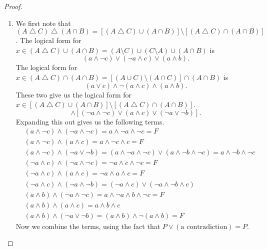 \documentclass[12pt]{amsart}
\theoremstyle{definition}
\theoremstyle{remark}
\begin{document}
\begin{proof}
\begin{enumerate}
	\item We first note that $(A \bigtriangleup C) \bigtriangleup (A \cap B) = [(A \bigtriangleup C) \cup (A \cap B)] \setminus [(A \bigtriangleup C) \cap (A \cap B)]$.
	The logical form for $x \in (A \bigtriangleup C) \cup (A \cap B) = (A \setminus C) \cup (C \setminus A) \cup (A \cap B)$ is
	\begin{equation*}
		(a \wedge \neg c) \vee (\neg a \wedge c) \vee (a \wedge b).
	\end{equation*}
	The logical form for $x \in (A \bigtriangleup C) \cap (A \cap B) = [(A \cup C) \setminus (A \cap C)] \cap (A \cap B)$ is
	\begin{equation*}
		(a \vee c) \wedge \neg (a \wedge c) \wedge (a \wedge b).
	\end{equation*}
	These two give us the logical form for $x \in [(A \bigtriangleup C) \cup (A \cap B)] \setminus [(A \bigtriangleup C) \cap (A \cap B)]$.
	\begin{equation*}
		[(a \wedge \neg c) \vee (\neg a \wedge c) \vee (a \wedge b)]
		\wedge [(\neg a \wedge \neg c) \vee (a \wedge c) \vee (\neg a \vee \neg b)].
	\end{equation*}
	Expanding this out gives us the following terms.
	\begin{align*}
		& (a \wedge \neg c) \wedge (\neg a \wedge \neg c) = a \wedge \neg a \wedge \neg c = F \\
		& (a \wedge \neg c) \wedge (a \wedge c) = a \wedge \neg c \wedge c = F \\
		& (a \wedge \neg c) \wedge (\neg a \vee \neg b) 
			= (a \wedge \neg a \wedge \neg c) \vee (a \wedge \neg b \wedge \neg c)
			= a \wedge \neg b \wedge \neg c \\
		& (\neg a \wedge c) \wedge (\neg a \wedge \neg c) = \neg a \wedge c \wedge \neg c = F \\
		& (\neg a \wedge c) \wedge (a \wedge c) = \neg a \wedge a \wedge c = F \\
		& (\neg a \wedge c) \wedge (\neg a \wedge \neg b) 
			= (\neg a \wedge c) \vee (\neg a \wedge \neg b \wedge c) \\
		& (a \wedge b) \wedge (\neg a \wedge \neg c) 
		= a \wedge \neg a \wedge b \wedge \neg c = F \\
		& (a \wedge b) \wedge (a \wedge c) = a \wedge b \wedge c \\
		& (a \wedge b) \wedge (\neg a \vee \neg b) 
			= (a \wedge b) \wedge \neg (a \wedge b) = F
	\end{align*}
	Now we combine the terms, using the fact that $P \vee (\text{a contradiction}) = P$.

\end{enumerate}
\end{proof}
\end{document}
